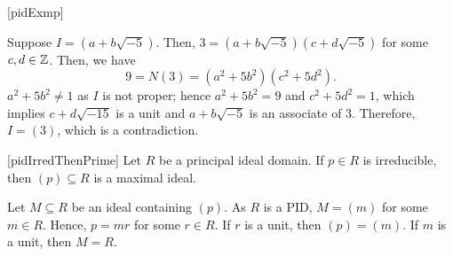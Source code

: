 \documentclass[../modern_algebra_2.tex]{subfiles}
\begin{document}
\begin{Example}{}[pidExmp]
\begin{enumerate}[label=(\roman*), ref=\protect{\Cref{exmp:pidExmp} (\roman*)}]
    Suppose \(I = (a+b\sqrt{-5})\).
    Then, \(3 = (a+b\sqrt{-5})(c+d\sqrt{-5})\) for some \(c, d \in \ZZ\).
    Then, we have
    \[
        9 = N(3) = (a^2+5b^2)(c^2+5d^2)\text{.}
    \]
    \(a^2+5b^2 \neq 1\) as \(I\) is not proper; hence
    \(a^2+5b^2 = 9\) and \(c^2+5d^2 = 1\),
    which implies \(c+d\sqrt{-15}\) is a unit and \(a+b\sqrt{-5}\) is an associate of \(3\).
    Therefore, \(I = (3)\), which is a contradiction.
\end{enumerate}
\end{Example}

\begin{Theorem}{}[pidIrredThenPrime]
    Let \(R\) be a principal ideal domain.
    If \(p \in R\) is irreducible, then \((p) \subseteq R\) is a maximal ideal.
\end{Theorem}
\begin{myproof}[Proof]
    Let \(M \subseteq R\) be an ideal containing \((p)\).
    As \(R\) is a PID, \(M = (m)\) for some \(m \in R\).
    Hence, \(p = mr\) for some \(r \in R\).
    If \(r\) is a unit, then \((p) = (m)\).
    If \(m\) is a unit, then \(M = R\).
\end{myproof}
\end{document}
